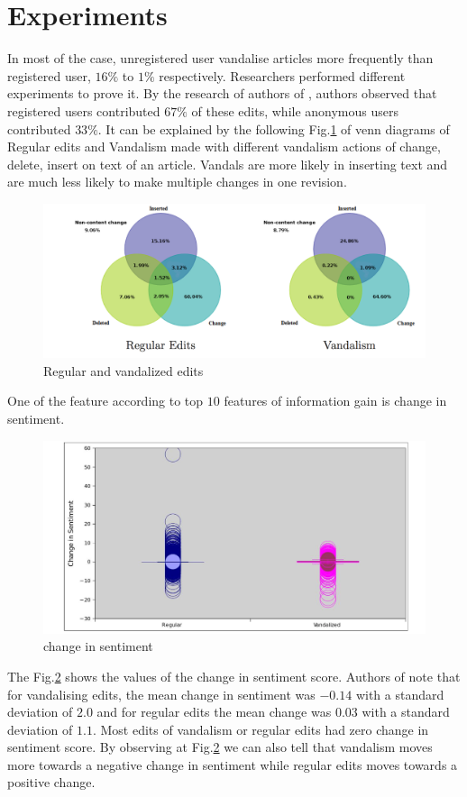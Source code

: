 \documentclass[12pt]{article}
\begin{document}
\section*{Experiments}
In most of the case, unregistered user vandalise articles more frequently than registered user, $16\%$ to $1\%$ respectively. Researchers performed different experiments to prove it. By the research of authors of \cite{wiki}, authors observed that registered users contributed $67\%$ of these edits, while anonymous users contributed $33\%$. It can be explained by the following Fig.\ref{regular} of venn diagrams of Regular edits and Vandalism made with different vandalism actions of change, delete, insert on text of an article. Vandals are more likely in inserting text and are much less likely to make multiple changes in one revision.
\begin{figure}[h]
\centering
\includegraphics[scale=0.5]{regular.png}
\caption{Regular and vandalized edits\cite{wiki}}
\label{regular}
\end{figure}
One of the feature  according to top $10$ features of information gain is change in sentiment.
\begin{figure}[h]
\centering
\includegraphics[scale=0.5]{sentiment.png}
\caption{change in sentiment\cite{wiki}}
\label{sentiment}
\end{figure}
The Fig.\ref{sentiment} shows the values of the change in sentiment score. Authors of \cite{wiki}note that for vandalising edits, the mean change in sentiment was $−0.14$ with a standard deviation of $2.0$ and for regular edits the mean change was $0.03$ with a standard deviation of $1.1$. Most edits of vandalism or regular edits had zero change in sentiment score. By observing at Fig.\ref{sentiment} we can also tell that vandalism moves more towards a negative change in sentiment while regular edits moves towards a positive change.\\
\end{document}
